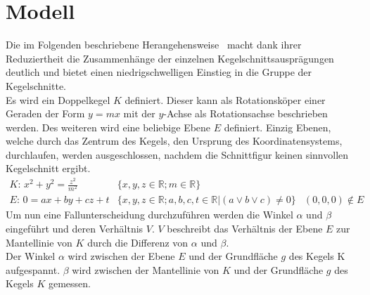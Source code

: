 \setcounter{section}{0}
\section{Modell}
Die im Folgenden beschriebene Herangehensweise~\cite[S.83f]{Jennings:1994} macht dank ihrer Reduziertheit die Zusammenhänge der einzelnen Kegelschnittsausprägungen deutlich und bietet einen niedrigschwelligen Einstieg in die Gruppe der Kegelschnitte.\\
Es wird ein Doppelkegel $K$ definiert\cite[S.793]{Bronstein:1996}. Dieser kann als Rotationsköper einer Geraden der Form $y=mx$ mit der $y$-Achse als Rotationsachse beschrieben werden. Des weiteren wird eine beliebige Ebene $E$ definiert. Einzig Ebenen, welche durch das Zentrum des Kegels, den Ursprung des Koordinatensystems, durchlaufen, werden ausgeschlossen, nachdem die Schnittfigur keinen sinnvollen Kegelschnitt ergibt.
\begin{displaymath}
	\begin{array}{lrl}
		\text{$K$: }x^2+y^2=\frac{z^2}{m^2} & \{x,y,z\in \mathbb{R};m\in \mathbb{R}\}\\
		\text{$E$: }0=ax+by+cz+t & \{x,y,z\in \mathbb{R}; a,b,c,t\in \mathbb{R}|(a \lor b \lor c) \neq 0\} & (0,0,0) \notin E
	\end{array}
\end{displaymath}
Um nun eine Fallunterscheidung durchzuführen werden die Winkel \(\alpha\) und \(\beta\) eingeführt und deren Verhältnis $V$. $V$ beschreibt das Verhältnis der Ebene $E$ zur Mantellinie von $K$ durch die Differenz von \(\alpha\) und \(\beta\).\\
Der Winkel \(\alpha\) wird zwischen der Ebene $E$ und der Grundfläche $g$ des Kegels K aufgespannt. \(\beta\) wird zwischen der Mantellinie von $K$ und der Grundfläche $g$ des Kegels $K$ gemessen.\\

